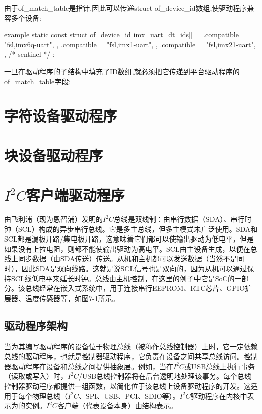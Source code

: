 \documentclass[lang=cn,newtx,10pt,scheme=chinese]{elegantbook}
\begin{document}
由于of\_match\_table是指针,因此可以传递struct of\_device\_id数组,使驱动程序兼容多个设备:

\begin{mycode}{example}
static const struct of_device_id imx_uart_dt_ids[] = {
    { .compatible = "fsl,imx6q-uart", },
    { .compatible = "fsl,imx1-uart", },
    { .compatible = "fsl,imx21-uart", },
    { /* sentinel */ }
};
\end{mycode}

一旦在驱动程序的子结构中填充了ID数组,就必须把它传递到平台驱动程序的of\_match\_table字段:

\chapter{字符设备驱动程序}

\chapter{块设备驱动程序}

\chapter{\texorpdfstring{$I^2C$客户端驱动程序}{I2C客户端驱动程序}}

由飞利浦（现为恩智浦）发明的$I^2C$总线是双线制：由串行数据（SDA）、串行时钟（SCL）构成的异步串行总线。它是多主总线，但多主模式未广泛使用。SDA和SCL都是漏极开路/集电极开路，这意味着它们都可以使输出驱动为低电平，但是如果没有上拉电阻，则都不能使输出驱动为高电平。SCL由主设备生成，以便在总线上同步数据（由SDA传送）传送。从机和主机都可以发送数据（当然不是同时），因此SDA是双向线路。这就是说SCL信号也是双向的，因为从机可以通过保持SCL线低电平来延长时钟。总线由主机控制，在这里的例子中它是SoC的一部分。该总线经常在嵌入式系统中，用于连接串行EEPROM、RTC芯片、GPIO扩展器、温度传感器等，如图7-1所示。

\section{驱动程序架构}

当为其编写驱动程序的设备位于物理总线（被称作总线控制器）上时，它一定依赖总线的驱动程序，也就是控制器驱动程序，它负责在设备之间共享总线访问。控制器驱动程序在设备和总线之间提供抽象层。例如，当在$I^2C$或USB总线上执行事务（读取或写入）时，$I^2C$/USB总线控制器将在后台透明地处理该事务。每个总线控制器驱动程序都提供一组函数，以简化位于该总线上设备驱动程序的开发。这适用于每个物理总线（$I^2C$、SPI、USB、PCI、SDIO等）。$I^2C$驱动程序在内核中表示为的实例。$I^2C$客户端（代表设备本身）由结构表示。
\end{document}
